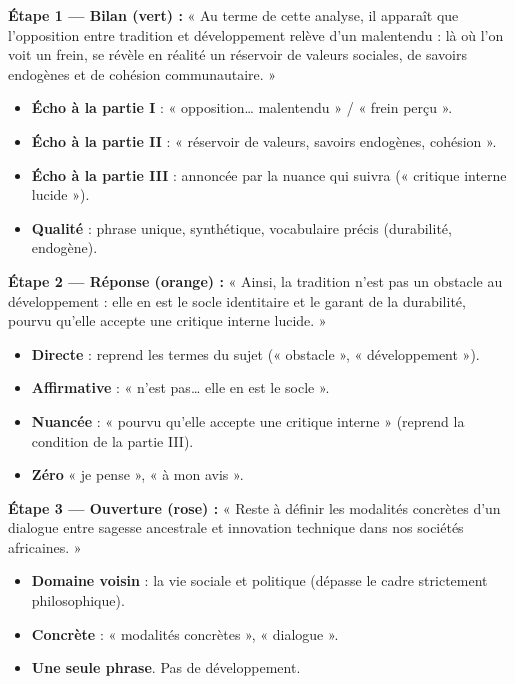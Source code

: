 \documentclass[11pt]{article}
\begin{document}
\begin{exoresolu}
\textbf{Étape 1 — Bilan (vert) :} « Au terme de cette analyse, il apparaît que l'opposition entre tradition et développement relève d'un malentendu : là où l'on voit un frein, se révèle en réalité un réservoir de valeurs sociales, de savoirs endogènes et de cohésion communautaire. »
\begin{itemize}
    \item \textbf{Écho à la partie I} : « opposition… malentendu » / « frein perçu ».
    \item \textbf{Écho à la partie II} : « réservoir de valeurs, savoirs endogènes, cohésion ».
    \item \textbf{Écho à la partie III} : annoncée par la nuance qui suivra (« critique interne lucide »).
    \item \textbf{Qualité} : phrase unique, synthétique, vocabulaire précis (durabilité, endogène).
\end{itemize}

\textbf{Étape 2 — Réponse (orange) :} « Ainsi, la tradition n'est pas un obstacle au développement : elle en est le socle identitaire et le garant de la durabilité, pourvu qu'elle accepte une critique interne lucide. »
\begin{itemize}
    \item \textbf{Directe} : reprend les termes du sujet (« obstacle », « développement »).
    \item \textbf{Affirmative} : « n'est pas… elle en est le socle ».
    \item \textbf{Nuancée} : « pourvu qu'elle accepte une critique interne » (reprend la condition de la partie III).
    \item \textbf{Zéro} « je pense », « à mon avis ».
\end{itemize}

\textbf{Étape 3 — Ouverture (rose) :} « Reste à définir les modalités concrètes d'un dialogue entre sagesse ancestrale et innovation technique dans nos sociétés africaines. »
\begin{itemize}
    \item \textbf{Domaine voisin} : la vie sociale et politique (dépasse le cadre strictement philosophique).
    \item \textbf{Concrète} : « modalités concrètes », « dialogue ».
    \item \textbf{Une seule phrase}. Pas de développement.
\end{itemize}
\end{exoresolu}
\end{document}
